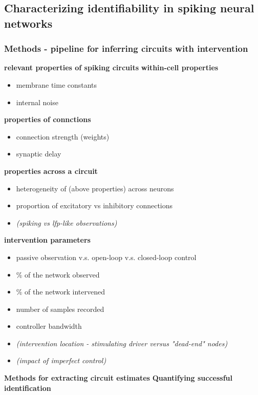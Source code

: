 \subsection{Characterizing identifiability in spiking neural networks}

\subsubsection{Methods - pipeline for inferring circuits with intervention}

\textbf{relevant properties of spiking circuits}
\textbf{within-cell properties}
\begin{itemize}
    \item membrane time constants
    \item internal noise
\end{itemize}

\textbf{properties of connctions}
\begin{itemize}
    \item connection strength (weights)
    \item synaptic delay
\end{itemize}

\textbf{properties across a circuit}
\begin{itemize}
    \item heterogeneity of (above properties) across neurons
    \item proportion of excitatory vs inhibitory connections
    \item \textit{(spiking vs lfp-like observations)}
\end{itemize}

\textbf{intervention parameters}
\begin{itemize}
    \item passive observation v.s. open-loop v.s. closed-loop control
    \item \% of the network observed
    \item \% of the network intervened
    \item number of samples recorded
    \item controller bandwidth
    \item \textit{(intervention location - stimulating driver versus "dead-end" nodes)}
    \item \textit{(impact of imperfect control)}
\end{itemize}


\textbf{Methods for extracting circuit estimates}
\textbf{Quantifying successful identification}

